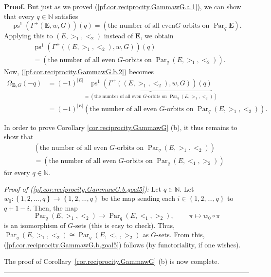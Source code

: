 \documentclass[numbers=enddot,12pt,final,onecolumn,notitlepage,abstracton]{scrartcl}%
\theoremstyle{definition}
\newenvironment{proof}[1][Proof]{\noindent\textbf{#1.} }{\ \rule{0.5em}{0.5em}}
\newcommand{\Par}{\operatorname{Par}}
\newcommand{\EE}{{\mathbf{E}}}
\newcommand{\NN}{{\mathbb{N}}}
\begin{document}
\begin{proof}
But just as we proved (\ref{pf.cor.reciprocity.GammawG.a.1}), we can show that
every $q\in \NN $ satisfies
\[
\operatorname{ps}^{1}\left(  \Gamma^{+}\left( \EE ,
w,G\right)  \right)  \left(  q\right)  =\left(  \text{the number of all even
}G\text{-orbits on } \Par_q \EE \right)  .
\]
Applying this to $\left(  E,>_{1},<_{2}\right)  $ instead of $\mathbf{E}$, we
obtain%
\begin{align*}
&  \operatorname{ps}^{1}\left(  \Gamma^{+}\left(  \left(
E,>_{1},<_{2}\right)  ,w,G\right)  \right)  \left(  q\right) \\
&  =\left(  \text{the number of all even }G\text{-orbits on }%
\Par_q \left(  E,>_{1},<_{2}\right)  \right)  .
\end{align*}
Now, (\ref{pf.cor.reciprocity.GammawG.b.2}) becomes%
\begin{align*}
\Omega_{\EE, G}\left(  -q\right)   &  =\left(  -1\right)  ^{\left\vert
E\right\vert }\underbrace{\operatorname{ps}^{1}\left(  \Gamma
^{+}\left(  \left(  E,>_{1},<_{2}\right)  ,w,G\right)  \right)  \left(
q\right)  }_{=\left(  \text{the number of all even }G\text{-orbits on }
\Par_q \left(  E,>_{1},<_{2}\right)  \right)  }\\
&  =\left(  -1\right)  ^{\left\vert E\right\vert }\left(  \text{the number of
all even }G\text{-orbits on }
\Par_q \left( E,>_{1},<_{2}\right)  \right)  .
\end{align*}


In order to prove Corollary \ref{cor.reciprocity.GammawG} (b), it thus remains
to show that
\begin{align}
&  \left(  \text{the number of all even }G\text{-orbits on }%
\Par_{q} \left(  E,>_{1},<_{2}\right)  \right)
\nonumber\\
&  =\left(  \text{the number of all even }G\text{-orbits on }%
\Par_{q} \left(  E,<_{1},>_{2}\right)  \right)
\label{pf.cor.reciprocity.GammawG.b.goal5}
\end{align}
for every $q\in \NN $.

\textit{Proof of (\ref{pf.cor.reciprocity.GammawG.b.goal5}):} Let
$q\in \NN $. Let $w_{0}:\left\{  1,2,\ldots,q\right\}  \rightarrow
\left\{  1,2,\ldots,q\right\}  $ be the map sending each $i\in\left\{
1,2,\ldots,q\right\}  $ to $q+1-i$. Then, the map
\[
 \Par_q \left(  E,>_{1},<_{2}\right)  \rightarrow
 \Par_q \left(  E,<_{1},>_{2}\right)
,\ \ \ \ \ \ \ \ \ \ \pi\mapsto w_{0}\circ\pi
\]
is an isomorphism of $G$-sets (this is easy to check). Thus,
$\Par_q \left(  E,>_{1},<_{2}\right)  \cong
 \Par_q \left(  E,<_{1},>_{2}\right)  $ as $G$-sets.
From this, (\ref{pf.cor.reciprocity.GammawG.b.goal5}) follows (by
functoriality, if one wishes).

The proof of Corollary~\ref{cor.reciprocity.GammawG} (b) is now complete.
\end{proof}
\end{document}
